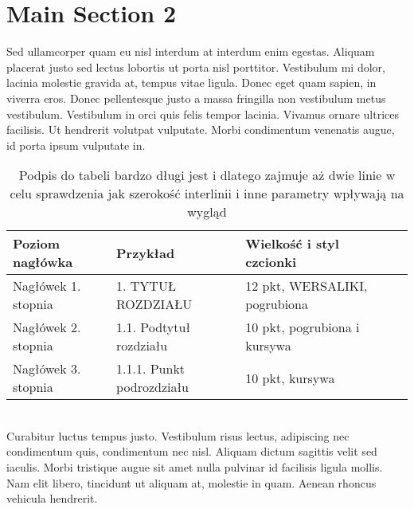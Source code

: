 \section{Main Section 2}
Sed ullamcorper quam eu nisl interdum at interdum enim egestas. Aliquam placerat justo sed lectus lobortis ut porta nisl porttitor. Vestibulum mi dolor, lacinia molestie gravida at, tempus vitae ligula. Donec eget quam sapien, in viverra eros. Donec pellentesque justo a massa fringilla non vestibulum metus vestibulum. Vestibulum in orci quis felis tempor lacinia. Vivamus ornare ultrices facilisis. Ut hendrerit volutpat vulputate. Morbi condimentum venenatis augue, id porta ipsum vulputate in. 
\begin{table}[ht]
\centering
\caption{Podpis do tabeli bardzo długi jest i dlatego zajmuje aż dwie linie w celu sprawdzenia jak szerokość interlinii i inne parametry wpływają na wygląd}
\label{Tab2}
\small
\begin{tabularx}{\textwidth}{ |X|X|X|X| }
\hline
Poziom nagłówka & Przykład & Wielkość i styl czcionki \\
  \hline
Nagłówek 1. stopnia	& 1. TYTUŁ ROZDZIAŁU & 12 pkt, WERSALIKI, pogrubiona \\
\hline
Nagłówek 2. stopnia & 1.1. Podtytuł rozdziału & 10 pkt, pogrubiona i kursywa \\
\hline
Nagłówek 3. stopnia & 1.1.1. Punkt podrozdziału & 10 pkt, kursywa \\
\hline
\end{tabularx}
\end{table}
\\Curabitur luctus tempus justo. Vestibulum risus lectus, adipiscing nec condimentum quis, condimentum nec nisl. Aliquam dictum sagittis velit sed iaculis. Morbi tristique augue sit amet nulla pulvinar \cite{3s2b} id facilisis ligula mollis. Nam elit libero, tincidunt ut aliquam at, molestie in quam. Aenean rhoncus vehicula hendrerit.